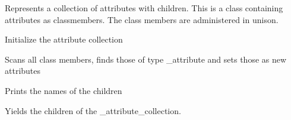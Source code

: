 \documentclass[letterpaper,10pt,english]{sphinxmanual}
\begin{document}
\begin{fulllineitems}
\label{\detokenize{autoapi/unduwave/index:id12}}
\pysigstartsignatures
{}
\pysigstopsignatures
\sphinxAtStartPar
Represents a collection of attributes with children.
This is a class containing attributes as class\sphinxhyphen{}members.
The class members are administered in unison.

\sphinxAtStartPar
Initialize the attribute collection

\begin{fulllineitems}
\label{\detokenize{autoapi/unduwave/index:id13}}
\pysigstartsignatures
{}
\pysigstopsignatures
\sphinxAtStartPar
Scans all class members, finds those of type \_attribute and sets those
as new attributes

\end{fulllineitems}


\begin{fulllineitems}
\label{\detokenize{autoapi/unduwave/index:id14}}
\pysigstartsignatures
{}
\pysigstopsignatures
\sphinxAtStartPar
Prints the names of the children

\end{fulllineitems}


\begin{fulllineitems}
\label{\detokenize{autoapi/unduwave/index:id15}}
\pysigstartsignatures
{}
\pysigstopsignatures
\sphinxAtStartPar
Yields the children of the \_attribute\_collection.

\end{fulllineitems}


\end{fulllineitems}
\end{document}
